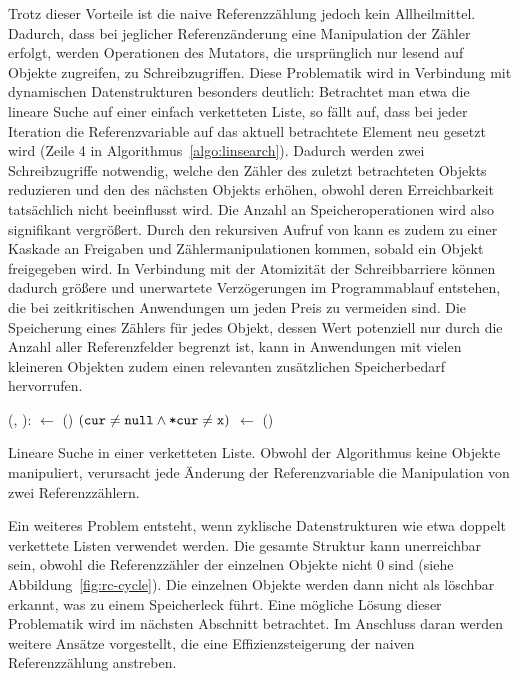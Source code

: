 Trotz dieser Vorteile ist die naive Referenzzählung jedoch kein Allheilmittel.
Dadurch, dass bei jeglicher Referenzänderung eine Manipulation der Zähler erfolgt, werden Operationen des Mutators, die ursprünglich nur lesend auf Objekte zugreifen, zu Schreibzugriffen.
Diese Problematik wird in Verbindung mit dynamischen Datenstrukturen besonders deutlich:
Betrachtet man etwa die lineare Suche auf einer einfach verketteten Liste, so fällt auf, dass bei jeder Iteration die Referenzvariable auf das aktuell betrachtete Element neu gesetzt wird (Zeile 4 in Algorithmus~\ref{algo:linsearch}).
Dadurch werden zwei Schreibzugriffe notwendig, welche den Zähler des zuletzt betrachteten Objekts reduzieren und den des nächsten Objekts erhöhen, obwohl deren Erreichbarkeit tatsächlich nicht beeinflusst wird.
Die Anzahl an Speicheroperationen wird also signifikant vergrößert.
Durch den rekursiven Aufruf von  kann es zudem zu einer Kaskade an Freigaben und Zählermanipulationen kommen, sobald ein Objekt freigegeben wird.
In Verbindung mit der Atomizität der Schreibbarriere können dadurch größere und unerwartete Verzögerungen im Programmablauf entstehen, die bei zeitkritischen Anwendungen um jeden Preis zu vermeiden sind.
Die Speicherung eines Zählers für jedes Objekt, dessen Wert potenziell nur durch die Anzahl aller Referenzfelder begrenzt ist, kann in Anwendungen mit vielen kleineren Objekten zudem einen relevanten zusätzlichen Speicherbedarf hervorrufen.

\begin{algorithm}[h]
\begin{algorithmic}[1]
	\State {}(, ):
	\State \quad {} $\gets$ ()
	\State \quad \WHILE $(\texttt{cur} \neq \texttt{null} \wedge \texttt{*cur} \neq \texttt{x})$
	\State \quad \quad {} $\gets$ ()
	\State \quad \Return {} 
\end{algorithmic}
\caption[Lineare Suche]{Lineare Suche in einer verketteten Liste. Obwohl der Algorithmus keine Objekte manipuliert, verursacht jede Änderung der Referenzvariable  die Manipulation von zwei Referenzzählern.}
\label{algo:linsearch}
\end{algorithm}

Ein weiteres Problem entsteht, wenn zyklische Datenstrukturen wie etwa doppelt verkettete Listen verwendet werden.
Die gesamte Struktur kann unerreichbar sein, obwohl die Referenzzähler der einzelnen Objekte nicht $0$ sind (siehe Abbildung~\ref{fig:rc-cycle}).
Die einzelnen Objekte werden dann nicht als löschbar erkannt, was zu einem Speicherleck führt.
Eine mögliche Lösung dieser Problematik wird im nächsten Abschnitt betrachtet.
Im Anschluss daran werden weitere Ansätze vorgestellt, die eine Effizienzsteigerung der naiven Referenzzählung anstreben.


